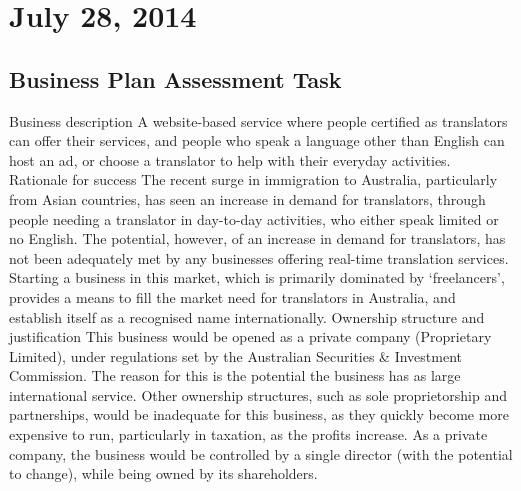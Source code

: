 \section{July 28, 2014}

\subsection{Business Plan Assessment Task}
\begin{outline}
\1 Business description
\2 A website-based service where people certified as translators can offer their services, and people who speak a language other than English can host an ad, or choose a translator to help with their everyday activities.
\1 Rationale for success
\2 The recent surge in immigration to Australia, particularly from Asian countries, has seen an increase in demand for translators, through people needing a translator in day-to-day activities, who either speak limited or no English. The potential, however, of an increase in demand for translators, has not been adequately met by any businesses offering real-time translation services. Starting a business in this market, which is primarily dominated by `freelancers', provides a means to fill the market need for translators in Australia, and establish itself as a recognised name internationally.
\1 Ownership structure and justification
\2 This business would be opened as a private company (Proprietary Limited), under regulations set by the Australian Securities \& Investment Commission. The reason for this is the potential the business has as large international service. Other ownership structures, such as sole proprietorship and partnerships, would be inadequate for this business, as they quickly become more expensive to run, particularly in taxation, as the profits increase. As a private company, the business would be controlled by a single director (with the potential to change), while being owned by its shareholders.
\end{outline}
